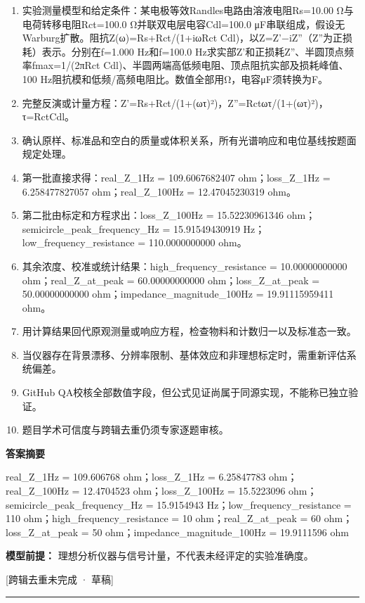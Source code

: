 \documentclass[UTF8,11pt,a4paper]{ctexart}
\begin{document}
\begin{enumerate}
\item 实验测量模型和给定条件：某电极等效Randles电路由溶液电阻Rs=10.00 Ω与电荷转移电阻Rct=100.0 Ω并联双电层电容Cdl=100.0 μF串联组成，假设无Warburg扩散。阻抗Z(ω)=Rs+Rct/(1+iωRct Cdl)，以Z=Z'−iZ''（Z''为正损耗）表示。分别在f=1.000 Hz和f=100.0 Hz求实部Z'和正损耗Z''、半圆顶点频率fmax=1/(2πRct Cdl)、半圆两端高低频电阻、顶点阻抗实部及损耗峰值、100 Hz阻抗模和低频/高频电阻比。数值全部用Ω，电容μF须转换为F。
\item 完整反演或计量方程：Z'=Rs+Rct/(1+(ωτ)²)，Z''=Rctωτ/(1+(ωτ)²)，τ=RctCdl。
\item 确认原样、标准品和空白的质量或体积关系，所有光谱响应和电位基线按题面规定处理。
\item 第一批直接求得：real\_Z\_1Hz = 109.6067682407 ohm；loss\_Z\_1Hz = 6.258477827057 ohm；real\_Z\_100Hz = 12.47045230319 ohm。
\item 第二批由标定和方程求出：loss\_Z\_100Hz = 15.52230961346 ohm；semicircle\_peak\_frequency\_Hz = 15.91549430919 Hz；low\_frequency\_resistance = 110.0000000000 ohm。
\item 其余浓度、校准或统计结果：high\_frequency\_resistance = 10.00000000000 ohm；real\_Z\_at\_peak = 60.00000000000 ohm；loss\_Z\_at\_peak = 50.00000000000 ohm；impedance\_magnitude\_100Hz = 19.91115959411 ohm。
\item 用计算结果回代原观测量或响应方程，检查物料和计数归一以及标准态一致。
\item 当仪器存在背景漂移、分辨率限制、基体效应和非理想标定时，需重新评估系统偏差。
\item GitHub QA校核全部数值字段，但公式见证尚属于同源实现，不能称已独立验证。
\item 题目学术可信度与跨辑去重仍须专家逐题审核。
\end{enumerate}
\noindent\textbf{答案摘要}\par
real\_Z\_1Hz = 109.606768 ohm；loss\_Z\_1Hz = 6.25847783 ohm；real\_Z\_100Hz = 12.4704523 ohm；loss\_Z\_100Hz = 15.5223096 ohm；semicircle\_peak\_frequency\_Hz = 15.9154943 Hz；low\_frequency\_resistance = 110 ohm；high\_frequency\_resistance = 10 ohm；real\_Z\_at\_peak = 60 ohm；loss\_Z\_at\_peak = 50 ohm；impedance\_magnitude\_100Hz = 19.9111596 ohm\par
\noindent\textbf{模型前提：}
理想分析仪器与信号计量，不代表未经评定的实验准确度。\par
\noindent\textcolor{red!65!black}{[跨辑去重未完成 · 草稿]} \par
\medskip\hrule\medskip
{}
\end{document}

